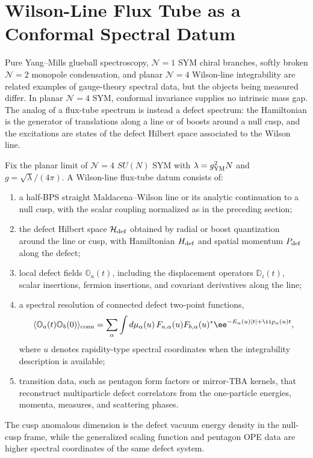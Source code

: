 \section{Wilson-Line Flux Tube as a Conformal Spectral Datum}
\label{sec:planar-n4-wilson-line-flux-tube-problem}

Pure Yang--Mills glueball spectroscopy, \(\mathcal N=1\) SYM chiral branches,
softly broken \(\mathcal N=2\) monopole condensation, and planar
\(\mathcal N=4\) Wilson-line integrability are related examples of
gauge-theory spectral data, but the objects being measured differ.  In
planar \(\mathcal N=4\) SYM, conformal invariance supplies no intrinsic mass
gap.  The analog of a flux-tube spectrum is instead a defect spectrum: the
Hamiltonian is the generator of translations along a line or of boosts around
a null cusp, and the excitations are states of the defect Hilbert space
associated to the Wilson line.

\begin{definition}[Planar \(\mathcal N=4\) Wilson-line flux-tube datum]
\label{def:planar-n4-wilson-line-flux-tube-problem}
Fix the planar limit of \(\mathcal N=4\) \(SU(N)\) SYM with
\(\lambda=g_{\rm YM}^2N\) and \(g=\sqrt\lambda/(4\pi)\).  A Wilson-line
flux-tube datum consists of:
\begin{enumerate}[label=(\roman*)]
\item a half-BPS straight Maldacena--Wilson line or its analytic continuation
  to a null cusp, with the scalar coupling normalized as in the preceding
  section;
\item the defect Hilbert space \(\mathcal H_{\rm def}\) obtained by radial or
  boost quantization around the line or cusp, with Hamiltonian \(H_{\rm def}\)
  and spatial momentum \(P_{\rm def}\) along the defect;
\item local defect fields \(\mathbb O_a(t)\), including the displacement
  operators \(\mathbb D_i(t)\), scalar insertions, fermion insertions, and
  covariant derivatives along the line;
\item a spectral resolution of connected defect two-point functions,
  \begin{equation}
    \langle\mathbb O_a(t)\mathbb O_b(0)\rangle_{\rm conn}
    =
    \sum_\alpha
    \int d\mu_\alpha(u)\,
    F_{a,\alpha}(u)F_{b,\alpha}(u)^*
    \ee^{-E_\alpha(u)|t|+\ii p_\alpha(u)t},
    \label{eq:planar-n4-defect-spectral-resolution}
  \end{equation}
  where \(u\) denotes rapidity-type spectral coordinates when the
  integrability description is available;
\item transition data, such as pentagon form factors or mirror-TBA kernels,
  that reconstruct multiparticle defect correlators from the one-particle
  energies, momenta, measures, and scattering phases.
\end{enumerate}
The cusp anomalous dimension is the defect vacuum energy density in the
null-cusp frame, while the generalized scaling function and pentagon OPE data
are higher spectral coordinates of the same defect system.
\end{definition}

